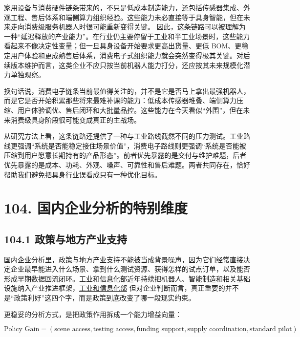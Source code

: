 家用设备与消费硬件链条带来的，不只是低成本制造能力，还包括传感器集成、外观工程、售后体系和端侧算力组织经验。这些能力未必直接等于具身智能，但在未来走向消费级服务机器人时很可能重新变得关键。 因此，这条链路可以被理解为一种“延迟释放的产业能力”。在行业仍主要停留于工业和半工业场景时，这些能力看起来不像决定性变量；但一旦具身设备开始要求更高出货量、更低 BOM、更稳定用户体验和更成熟售后体系，消费电子式组织能力就会突然变得极其关键。对后续版本维护而言，这类企业不应只按当前机器人能力打分，还应按其未来规模化潜力单独观察。

换句话说，消费电子链条当前最值得关注的，并不是它是否马上拿出最强机器人，而是它是否开始积累那些将来最难补课的能力：低成本传感器堆叠、端侧算力压缩、用户体验调优、售后闭环和大批量品控。这些能力在今天看似“外围”，但在未来消费级具身阶段很可能变成真正的主战场。

从研究方法上看，这条链路还提供了一种与工业路线截然不同的压力测试。工业路线更强调“系统是否能稳定接住场景价值”，消费电子路线则更强调“系统是否能被压缩到用户愿意长期持有的产品形态”。前者优先暴露的是交付与维护难题，后者优先暴露的是成本、功耗、外观、噪声、可靠性和售后难题。两者共同存在，恰好帮助我们避免把具身行业误看成只有一种优化目标。

\chapter*{104. 国内企业分析的特别维度}

\section*{104.1 政策与地方产业支持}


国内企业分析里，政策与地方产业支持不能被当成背景噪声，因为它们经常直接决定企业最早能进入什么场景、拿到什么测试资源、获得怎样的试点订单，以及能否形成早期数据回流闭环。工业和信息化部近年持续把机器人、智能制造和相关基础设施纳入产业推进框架，\href{https://www.miit.gov.cn/}{工业和信息化部} 但对企业判断而言，真正重要的并不是“政策利好”这四个字，而是政策到底改变了哪一段现实约束。

更稳妥的分析方式，是把政策作用拆成一个能力增益向量：

\begingroup
\scriptsize
\begin{equation*}
\text{Policy Gain} =
(\text{scene access}, \text{testing access}, \text{funding support}, \text{supply coordination}, \text{standard pilot}).
\end{equation*}
\endgroup

